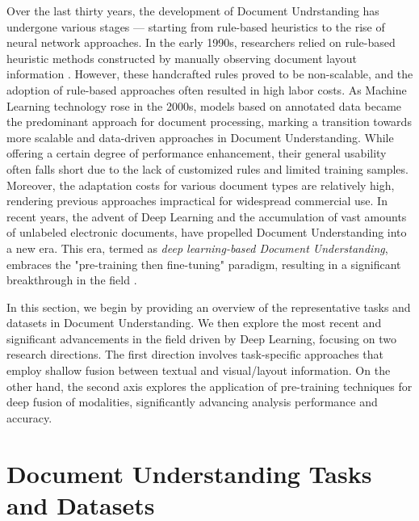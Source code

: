 Over the last thirty years, the development of Document Undrstanding has undergone various stages — starting from rule-based heuristics to the rise of neural network approaches. In the early 1990s, researchers relied on rule-based heuristic methods constructed by manually observing document layout information \citep{wong1982document, fisher1990rule, lebourgeois1992fast}. However, these handcrafted rules proved to be non-scalable, and the adoption of rule-based approaches often resulted in high labor costs. As Machine Learning technology rose in the 2000s, models based on annotated data \citep{baechler2011multi, wei2013evaluation} became the predominant approach for document processing, marking a transition towards more scalable and data-driven approaches in Document Understanding. While offering a certain degree of performance enhancement, their general usability often falls short due to the lack of customized rules and limited training samples. Moreover, the adaptation costs for various document types are relatively high, rendering previous approaches impractical for widespread commercial use. In recent years, the advent of Deep Learning and the accumulation of vast amounts of unlabeled electronic documents, have propelled Document Understanding into a new era. This era, termed as \textit{deep learning-based Document Understanding}, embraces the "pre-training then fine-tuning" paradigm, resulting in a significant breakthrough in the field \citep{xu2020layoutlm, peng2022ernie}.

In this section, we begin by providing an overview of the representative tasks and datasets in Document Understanding. We then explore the most recent and significant advancements in the field driven by Deep Learning, focusing on two research directions. The first direction involves task-specific approaches that employ shallow fusion between textual and visual/layout information. On the other hand, the second axis explores the application of pre-training techniques for deep fusion of modalities, significantly advancing analysis performance and accuracy. 


\section{Document Understanding Tasks and Datasets}



